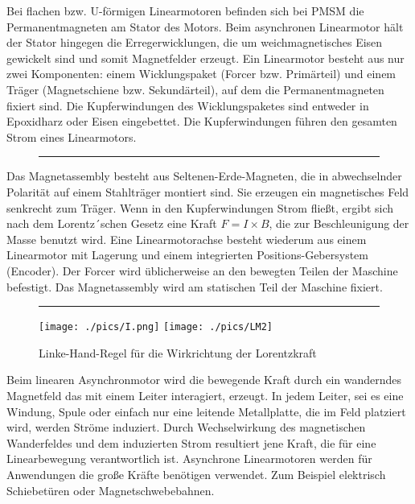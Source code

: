 \begin{description}[leftmargin=2.5cm]
					\item[Flache, U-förmige Linearmotoren] 
					Bei flachen bzw. U-förmigen Linearmotoren befinden sich bei PMSM die Permanentmagneten am Stator des Motors. Beim asynchronen Linearmotor hält der Stator hingegen die Erregerwicklungen, die um weichmagnetisches Eisen gewickelt sind und somit Magnetfelder erzeugt.	Ein Linearmotor besteht aus nur zwei Komponenten: einem Wicklungspaket (Forcer bzw. Primärteil) und einem Träger (Magnetschiene bzw. Sekundärteil), auf dem die Permanentmagneten fixiert sind. Die Kupferwindungen des Wicklungspaketes sind entweder in Epoxidharz oder Eisen eingebettet. Die Kupferwindungen führen den gesamten Strom eines Linearmotors. 	
					\begin{figure}[h]
						\centering \rule{2.5cm}{0cm}
						 \hspace{0.4cm}
					\end{figure}					
					Das Magnetassembly besteht aus Seltenen-Erde-Magneten, die in abwechselnder Polarität auf einem Stahlträger montiert sind. Sie erzeugen ein magnetisches Feld senkrecht zum Träger. Wenn in den Kupferwindungen Strom fließt, ergibt sich nach dem Lorentz´schen Gesetz eine Kraft $ F = I \times B $, die zur Beschleunigung der Masse benutzt wird. Eine Linearmotorachse besteht wiederum aus einem Linearmotor mit Lagerung und einem integrierten Positions-Gebersystem (Encoder). Der Forcer wird üblicherweise an den bewegten Teilen der Maschine befestigt. Das Magnetassembly wird am statischen Teil der Maschine fixiert. 
					\begin{figure}[h]
						\centering \rule{2.5cm}{0cm}
						\texttt{[image: ./pics/I.png]} \hspace{1cm}
						\texttt{[image: ./pics/LM2]} 
						\caption{Linke-Hand-Regel für die Wirkrichtung der Lorentzkraft}
						\label{}
					\end{figure}
					
					\item[Asynhroner Linearmotor] 
					Beim linearen Asynchronmotor wird die bewegende Kraft durch ein wanderndes Magnetfeld das mit einem Leiter interagiert, erzeugt. In jedem Leiter, sei es eine Windung, Spule oder einfach nur eine leitende Metallplatte, die im Feld platziert wird, werden Ströme induziert. Durch Wechselwirkung des magnetischen Wanderfeldes und dem induzierten Strom resultiert jene Kraft, die für eine Linearbewegung verantwortlich ist. Asynchrone Linearmotoren werden für Anwendungen die große Kräfte benötigen verwendet. Zum Beispiel elektrisch Schiebetüren oder Magnetschwebebahnen.
					

\end{description}
